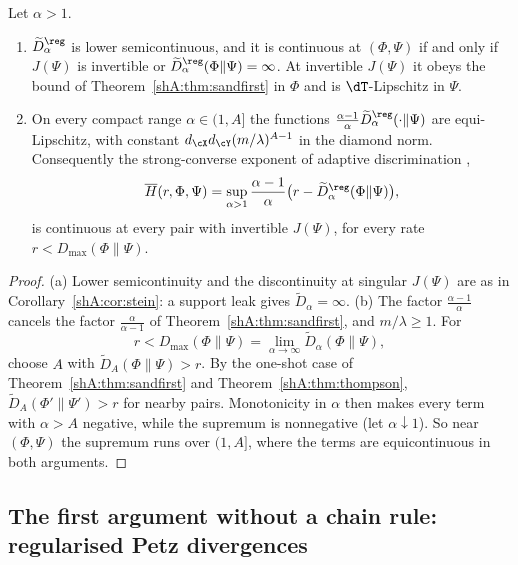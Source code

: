 \begin{corollary}\label{shA:cor:sand}
Let $\alpha>1$.
\begin{enumerate}[label=(\alph*)]
\item $\widetilde D^\reg_\alpha$ is lower semicontinuous, and it is continuous at $(\Phi,\Psi)$ if and only if $J(\Psi)$ is invertible or $\widetilde D^\reg_\alpha(\Phi\|\Psi)=\infty$. At invertible $J(\Psi)$ it obeys the bound of Theorem~\ref{shA:thm:sandfirst} in $\Phi$ and is $\dT$-Lipschitz in $\Psi$.
\item On every compact range $\alpha\in(1,A]$ the functions $\frac{\alpha-1}{\alpha}\widetilde D^\reg_\alpha(\cdot\|\Psi)$ are equi-Lipschitz, with constant $d_\cX d_\cY(m/\lambda)^{A-1}$ in the diamond norm. Consequently the strong-converse exponent of adaptive discrimination \cite[Theorem~5.5]{FawziFawzi2021},
\[
\overline H(r,\Phi,\Psi)=\sup_{\alpha>1}\frac{\alpha-1}{\alpha}\big(r-\widetilde D^\reg_\alpha(\Phi\|\Psi)\big),
\]
is continuous at every pair with invertible $J(\Psi)$, for every rate $r<D_{\max}(\Phi\|\Psi)$.
\end{enumerate}
\end{corollary}

\begin{proof}
(a) Lower semicontinuity and the discontinuity at singular $J(\Psi)$ are as in Corollary~\ref{shA:cor:stein}: a support leak gives $\widetilde D_\alpha=\infty$. (b) The factor $\frac{\alpha-1}{\alpha}$ cancels the factor $\frac{\alpha}{\alpha-1}$ of Theorem~\ref{shA:thm:sandfirst}, and $m/\lambda\ge1$. For
\[
r<D_{\max}(\Phi\|\Psi)=\lim_{\alpha\to\infty}\widetilde D_\alpha(\Phi\|\Psi),
\]
choose $A$ with $\widetilde D_A(\Phi\|\Psi)>r$. By the one-shot case of Theorem~\ref{shA:thm:sandfirst} and Theorem~\ref{shA:thm:thompson}, $\widetilde D_A(\Phi'\|\Psi')>r$ for nearby pairs. Monotonicity in $\alpha$ then makes every term with $\alpha>A$ negative, while the supremum is nonnegative (let $\alpha\downarrow1$). So near $(\Phi,\Psi)$ the supremum runs over $(1,A]$, where the terms are equicontinuous in both arguments.
\end{proof}

\subsection*{The first argument without a chain rule: regularised Petz divergences}

